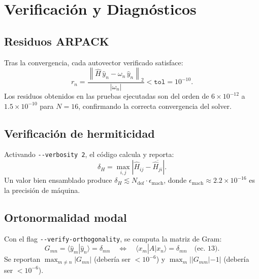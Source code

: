 \documentclass[12pt,a4paper]{article}
\newcommand{\Hhat}{\hat{H}}
\newcommand{\abs}[1]{\left|#1\right|}
\newcommand{\norm}[1]{\left\|#1\right\|}
\newcommand{\conj}[1]{\overline{#1}}
\begin{document}
\section{Verificación y Diagnósticos}

\subsection{Residuos ARPACK}

Tras la convergencia, cada autovector verificado satisface:
\begin{equation}
  r_n = \frac{\norm{\Hhat\,\hat{y}_n - \omega_n\,\hat{y}_n}_2}{|\omega_n|}
        < \texttt{tol} = 10^{-10}.
\end{equation}
Los residuos obtenidos en las pruebas ejecutadas son del orden de
$6\times10^{-12}$ a $1.5\times10^{-10}$ para $N=16$, confirmando la
correcta convergencia del solver.

\subsection{Verificación de hermiticidad}

Activando \texttt{-{}-verbosity 2}, el código calcula y reporta:
\begin{equation}
  \delta_H = \max_{i,j} \abs{\hat{H}_{ij} - \conj{\hat{H}_{ji}}}.
\end{equation}
Un valor bien ensamblado produce $\delta_H \lesssim N_\text{dof}\cdot\epsilon_\text{mach}$,
donde $\epsilon_\text{mach} \approx 2.2\times10^{-16}$ es la precisión de máquina.

\subsection{Ortonormalidad modal}

Con el flag \texttt{-{}-verify-orthogonality}, se computa la matriz de Gram:
\begin{equation}
  G_{mn} = \langle \hat{y}_m | \hat{y}_n \rangle = \delta_{mn}
  \quad \Leftrightarrow \quad
  \langle x_m | A | x_n \rangle = \delta_{mn} \quad \text{(ec.\ 13)}.
\end{equation}
Se reportan $\max_{m\neq n}|G_{mn}|$ (debería ser $< 10^{-6}$) y
$\max_m ||G_{mm}| - 1|$ (debería ser $< 10^{-6}$).

\end{document}
